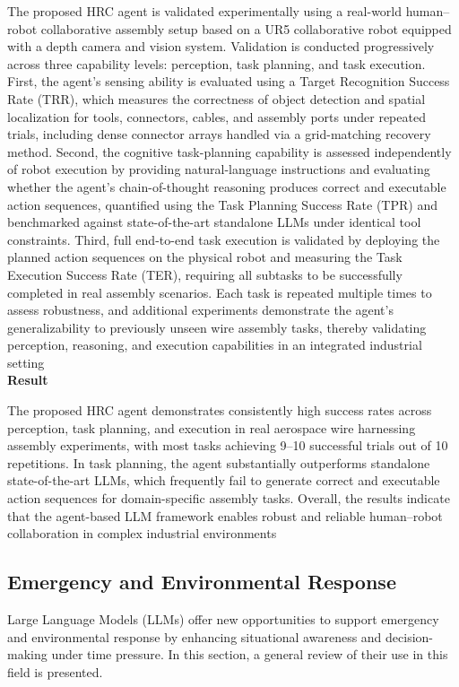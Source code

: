 The proposed HRC agent is validated experimentally using a real-world human–robot collaborative assembly setup based on a UR5 collaborative robot equipped with a depth camera and vision system.
Validation is conducted progressively across three capability levels: perception, task planning, and task execution.
First, the agent’s sensing ability is evaluated using a Target Recognition Success Rate (TRR), which measures the correctness of object detection and spatial localization for tools, connectors, cables, and assembly ports under repeated trials, including dense connector arrays handled via a grid-matching recovery method.
Second, the cognitive task-planning capability is assessed independently of robot execution by providing natural-language instructions and evaluating whether the agent’s chain-of-thought reasoning produces correct and executable action sequences, quantified using the Task Planning Success Rate (TPR) and benchmarked against state-of-the-art standalone LLMs under identical tool constraints.
Third, full end-to-end task execution is validated by deploying the planned action sequences on the physical robot and measuring the Task Execution Success Rate (TER), requiring all subtasks to be successfully completed in real assembly scenarios.
Each task is repeated multiple times to assess robustness, and additional experiments demonstrate the agent’s generalizability to previously unseen wire assembly tasks, thereby validating perception, reasoning, and execution capabilities in an integrated industrial setting
\\

\textbf{Result}

The proposed HRC agent demonstrates consistently high success rates across perception, task planning, and execution in real aerospace wire harnessing assembly experiments, with most tasks achieving 9–10 successful trials out of 10 repetitions.
In task planning, the agent substantially outperforms standalone state-of-the-art LLMs, which frequently fail to generate correct and executable action sequences for domain-specific assembly tasks.
Overall, the results indicate that the agent-based LLM framework enables robust and reliable human–robot collaboration in complex industrial environments
\\


\subsection{Emergency and Environmental Response}
Large Language Models (LLMs) offer new opportunities to support emergency and environmental response by enhancing situational awareness and decision-making under time pressure.
In this section, a general review of their use in this field is presented.

